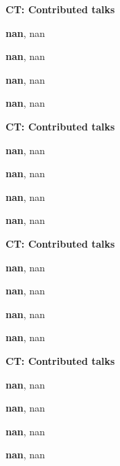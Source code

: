 \documentclass[ILAS2025-program.tex]{subfiles}
\begin{document}
\begin{description}
\begin{description}
        \end{description}
    \begin{description}
    \item[] {\color{mstitle}\textbf{CT: Contributed talks}} 
    \item[] \textbf{nan}, nan
        \item[] \textbf{nan}, nan
        \item[] \textbf{nan}, nan
        \item[] \textbf{nan}, nan
        \end{description}
    \begin{description}
    \item[] {\color{mstitle}\textbf{CT: Contributed talks}} 
    \item[] \textbf{nan}, nan
        \item[] \textbf{nan}, nan
        \item[] \textbf{nan}, nan
        \item[] \textbf{nan}, nan
        \end{description}
    \begin{description}
    \item[] {\color{mstitle}\textbf{CT: Contributed talks}} 
    \item[] \textbf{nan}, nan
        \item[] \textbf{nan}, nan
        \item[] \textbf{nan}, nan
        \item[] \textbf{nan}, nan
        \end{description}
    \begin{description}
    \item[] {\color{mstitle}\textbf{CT: Contributed talks}} 
    \item[] \textbf{nan}, nan
        \item[] \textbf{nan}, nan
        \item[] \textbf{nan}, nan
        \item[] \textbf{nan}, nan
        \end{description}

\end{description}
\end{document}
